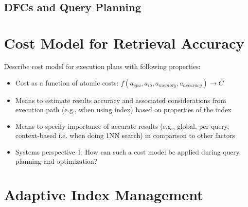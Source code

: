 \subsection{DFCs and Query Planning}
\label{section:dfc_and_planning}



\section{Cost Model for Retrieval Accuracy}
Describe cost model for execution plans with following properties:

\begin{itemize}
    \item Cost as a function of atomic costs: $f(a_{cpu}, a_{io}, a_{memory}, a_{accuracy}) \longrightarrow C$
    \item Means to estimate results accuracy and associated considerations from execution path (e.g., when using index) based on properties of the index
    \item Means to specify importance of accurate results (e.g., global, per-query, context-based i.e. when doing 1NN search) in comparison to other factors
    \item Systems perspective 1: How can such a cost model be applied during query planning and optimization?
\end{itemize}

\section{Adaptive Index Management}

